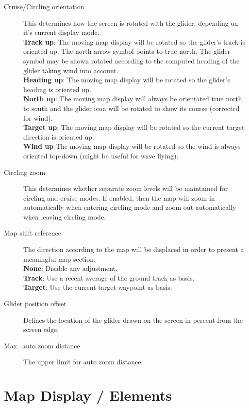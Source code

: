 \begin{description}
\item[Cruise/Circling orientation]  \label{conf:orientation} This determines how
  the screen is rotated with the glider, depending on it's current display mode. \\
  {\bf Track up}: The moving map display will be rotated so the glider's track
  is oriented up. The north arrow symbol points to true north. The glider symbol 
  may be shown rotated according to the computed heading of the glider taking 
  wind into account. \\
  {\bf Heading up}: The moving map display will be rotated so the glider's 
  heading is oriented up. \\
  {\bf North up}: The moving map display will always be orientated true north to
  south and the glider icon will be rotated to show its course (corrected for
  wind). \\
  {\bf Target up}: The moving map display will be rotated so the current target
  direction is oriented up. \\
  {\bf Wind up} The moving map display will be rotated so the wind is always 
  oriented top-down (might be useful for wave flying).
\item[Circling zoom]  \label{conf:circlingzoom} This determines whether separate
  zoom levels will be maintained for circling and cruise modes.  If enabled, then the 
  map will zoom in automatically when entering circling mode and zoom out
  automatically when leaving circling mode.
\item[Map shift reference]  The direction according to the map will be displaced 
  in order to present a meaningful map section. \\
  {\bf None}: Disable any adjustment. \\
  {\bf Track}: Use a recent average of the ground track as basis. \\
  {\bf Target}: Use the current target waypoint as basis.
\item[Glider position offset]  \label{conf:gliderposition} Defines the location of the 
  glider drawn on the screen in percent from the screen edge.
\item[Max.\ auto zoom distance]  The upper limit for auto zoom distance.
\end{description}


\section{Map Display / Elements}\label{sec:map-elements}

